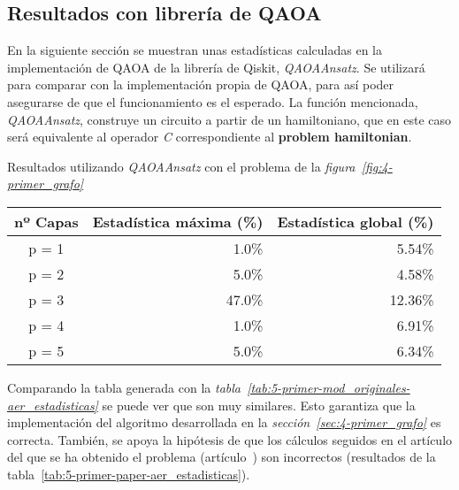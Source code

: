 \subsection{Resultados con librería de QAOA}

En la siguiente sección se muestran unas estadísticas calculadas en la implementación de QAOA de la librería de Qiskit, \textit{QAOAAnsatz}.
Se utilizará para comparar con la implementación propia de QAOA, para así poder asegurarse de que el funcionamiento es el esperado.
La función mencionada, \textit{QAOAAnsatz}, construye un circuito a partir de un hamiltoniano, que en este caso será equivalente al operador \textit{C} correspondiente al \textbf{problem hamiltonian}.

\begin{table}[htbp]{}{Resultados utilizando \textit{QAOAAnsatz} con el problema de la \textit{figura~\ref{fig:4-primer_grafo}}}
  \centering
  \begin{tabular}{|c|r|r|}
    \hline
    \textbf{nº Capas} & \textbf{Estadística máxima (\%)} & \textbf{Estadística global (\%)} \\ \hline
    p = 1             &  1.0\%                           &  5.54\%                          \\ \hline
    p = 2             &  5.0\%                           &  4.58\%                          \\ \hline
    p = 3             & 47.0\%                           & 12.36\%                          \\ \hline
    p = 4             &  1.0\%                           &  6.91\%                          \\ \hline
    p = 5             &  5.0\%                           &  6.34\%                          \\ \hline
  \end{tabular}
\end{table}

Comparando la tabla generada con la \textit{tabla~\ref{tab:5-primer-mod_originales-aer_estadisticas}} se puede ver que son muy similares.
Esto garantiza que la implementación del algoritmo desarrollada en la \textit{sección~\ref{sec:4-primer_grafo}} es correcta.
También, se apoya la hipótesis de que los cálculos seguidos en el artículo del que se ha obtenido el problema (artículo~\cite{multi-objective_routing_optimization}) son incorrectos (resultados de la tabla~\ref{tab:5-primer-paper-aer_estadisticas}).


